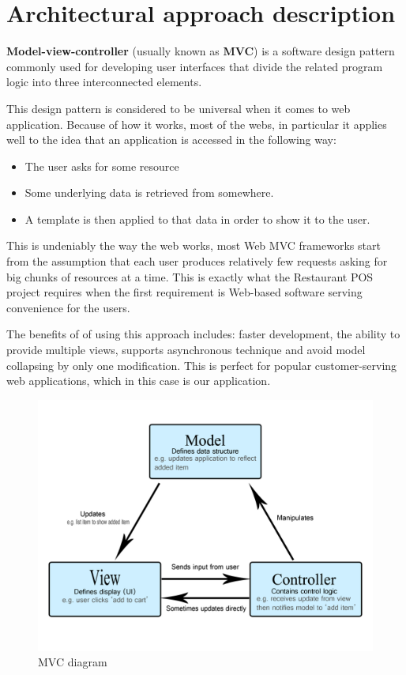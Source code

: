 \section{Architectural approach description}
\textbf{Model-view-controller} (usually known as \textbf{MVC}) is a software design pattern commonly used for developing user interfaces that divide the related program logic into three interconnected elements.

This design pattern is considered to be universal when it comes to web application.
Because of how it works, most of the webs, in particular it applies well to the idea that an application is accessed in the following way:
\begin{itemize}
  \item The user asks for some resource
  \item Some underlying data is retrieved from somewhere.
  \item A template is then applied to that data in order to show it to the user.
\end{itemize}

This is undeniably the way the web works, most Web MVC frameworks start from the assumption that each user produces relatively few requests asking for big chunks of resources at a time.
This is exactly what the Restaurant POS project requires when the first requirement is Web-based software serving convenience for the users.

The benefits of of using this approach includes: faster development, the ability to provide multiple views, supports asynchronous technique and avoid model collapsing by only one modification.
This is perfect for popular customer-serving web applications, which in this case is our application.

\begin{figure} [H]
    \centering
    \includegraphics[width=12cm]{assets/t3/model-view-controller.png}
    \caption{MVC diagram}
\end{figure}

